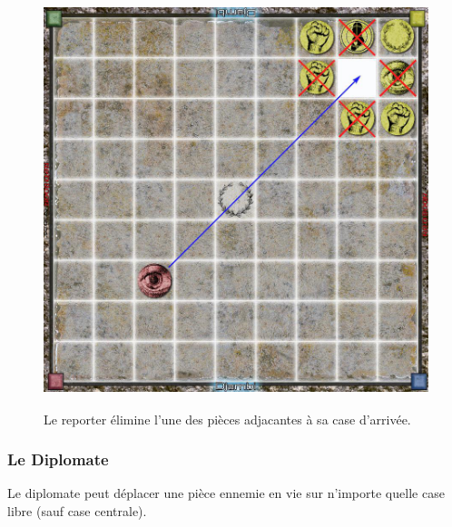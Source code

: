 \documentclass{article}
\begin{document}
\begin{figure}[ht]
\centering
\includegraphics[width=4.75972in,height=4.76111in]{media/image12.png}
\caption{Le reporter élimine l'une des pièces adjacantes à sa case d'arrivée.}
\end{figure}
\newpage


\subsubsection{Le Diplomate}
Le diplomate peut déplacer une pièce ennemie en vie sur n'importe quelle case libre (sauf case centrale).
\end{document}
